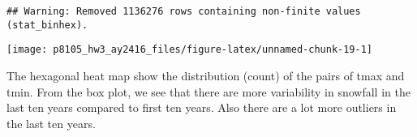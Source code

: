 \documentclass[]{article}
\newenvironment{Shaded}{\begin{snugshade}}{\end{snugshade}}
\newcommand{\KeywordTok}[1]{\textcolor[rgb]{0.13,0.29,0.53}{\textbf{#1}}}
\newcommand{\DataTypeTok}[1]{\textcolor[rgb]{0.13,0.29,0.53}{#1}}
\newcommand{\DecValTok}[1]{\textcolor[rgb]{0.00,0.00,0.81}{#1}}
\newcommand{\FloatTok}[1]{\textcolor[rgb]{0.00,0.00,0.81}{#1}}
\newcommand{\StringTok}[1]{\textcolor[rgb]{0.31,0.60,0.02}{#1}}
\newcommand{\OperatorTok}[1]{\textcolor[rgb]{0.81,0.36,0.00}{\textbf{#1}}}
\newcommand{\NormalTok}[1]{#1}
\begin{document}
\begin{Shaded}
\end{Shaded}

\begin{verbatim}
## Warning: Removed 1136276 rows containing non-finite values (stat_binhex).
\end{verbatim}

\texttt{[image: p8105\_hw3\_ay2416\_files/figure-latex/unnamed-chunk-19-1]}

The hexagonal heat map show the distribution (count) of the pairs of
tmax and tmin. From the box plot, we see that there are more variability
in snowfall in the last ten years compared to first ten years. Also
there are a lot more outliers in the last ten years.
\end{document}
